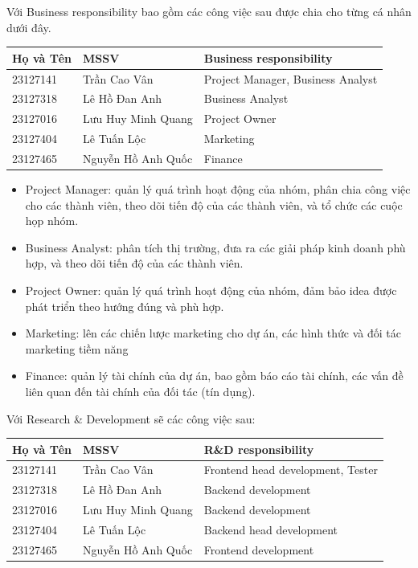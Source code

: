 \documentclass[12pt,a4paper]{article}
\begin{document}
Với Business responsibility bao gồm các công việc sau được chia cho từng cá nhân dưới đây.

\vspace{0.25cm}
\begin{tabular}{l l l}
\toprule
\textbf{Họ và Tên} & \textbf{MSSV} & \textbf{Business responsibility} \\
\midrule
23127141 & Trần Cao Vân & Project Manager, Business Analyst \\
23127318 & Lê Hồ Đan Anh & Business Analyst \\
23127016 & Lưu Huy Minh Quang & Project Owner \\
23127404 & Lê Tuấn Lộc & Marketing \\
23127465 & Nguyễn Hồ Anh Quốc & Finance\\
\bottomrule
\end{tabular}
\vspace{0.5cm}

\begin{itemize}
  \item Project Manager: quản lý quá trình hoạt động của nhóm, phân chia công việc cho các thành viên, theo dõi tiến độ của các thành viên, và tổ chức các cuộc họp nhóm.
  \item Business Analyst: phân tích thị trường, đưa ra các giải pháp kinh doanh phù hợp, và theo dõi tiến độ của các thành viên.
  \item Project Owner: quản lý quá trình hoạt động của nhóm, đảm bảo idea được phát triển theo hướng đúng và phù hợp.
  \item Marketing: lên các chiến lược marketing cho dự án, các hình thức và đối tác marketing tiềm năng
  \item Finance: quản lý tài chính của dự án, bao gồm báo cáo tài chính, các vấn đề liên quan đến tài chính của đối tác (tín dụng).
\end{itemize}

Với Research \& Development sẽ các công việc sau:

\vspace{0.25cm}
\begin{tabular}{l l l}
\toprule
\textbf{Họ và Tên} & \textbf{MSSV} & \textbf{R\&D responsibility} \\
\midrule
23127141 & Trần Cao Vân & Frontend head development, Tester \\
23127318 & Lê Hồ Đan Anh & Backend development \\
23127016 & Lưu Huy Minh Quang & Backend development \\
23127404 & Lê Tuấn Lộc & Backend head development \\
23127465 & Nguyễn Hồ Anh Quốc & Frontend development\\
\bottomrule
\end{tabular}
\vspace{0.5cm}
\end{document}
